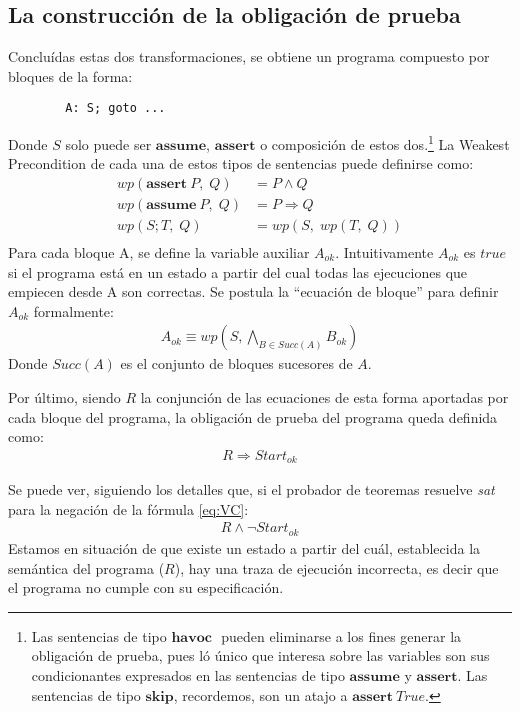 \documentclass[12pt, a4paper, openany, fleqn]{book}
\begin{document}
    \subsection*{La construcción de la obligación de prueba}
    Concluídas estas dos transformaciones, se obtiene un programa compuesto por bloques de la forma:
    \begin{verbatim}
        A: S; goto ...
    \end{verbatim} 
    Donde $S$ solo puede ser $\textbf{assume}$, $\textbf{assert}$ o composición de estos dos.\footnote{Las sentencias de tipo $\textbf{havoc }$ pueden eliminarse a los fines generar la obligación de prueba, pues ló único que interesa sobre las variables son sus condicionantes expresados en las sentencias de tipo $\textbf{assume}$ y $\textbf{assert}$. Las sentencias de tipo $\textbf{skip}$, recordemos, son un atajo a $\textbf{assert}\ True$.}
    La Weakest Precondition de cada una de estos tipos de sentencias puede definirse como:
    \begin{align*}
        wp(\textbf{assert}\ P,\;Q)   &= P \land Q \\
        wp(\textbf{assume}\  P,\; Q) &= P \Rightarrow Q \\
        wp(S;T,\;Q)                  &= wp(S,\;wp(T,\;Q)) \\
    \end{align*}
    Para cada bloque A, se define la variable auxiliar $A_{ok}$. Intuitivamente $A_{ok}$ es $true$ si el programa está en un estado a partir del cual todas las ejecuciones que empiecen desde A son correctas. Se postula la ``ecuación de bloque'' para definir $A_{ok}$ formalmente:
    \begin{align*}
        A_{ok} \equiv wp(S, \bigwedge_{B \in Succ(A)} B_{ok})
    \end{align*}
    Donde $Succ(A)$ es el conjunto de bloques sucesores de $A$.

    Por último, siendo $R$ la conjunción de las ecuaciones de esta forma aportadas por cada bloque del programa, la obligación de prueba del programa queda definida como:
    \begin{align}
        R \Rightarrow Start_{ok} \label{eq:VC}
    \end{align}

    Se puede ver, siguiendo los detalles que, si el probador de teoremas resuelve \textit{sat} para la negación de la fórmula \ref{eq:VC}:
    \begin{align*}
        R \land \lnot Start_{ok}
    \end{align*}
    Estamos en situación de que existe un estado a partir del cuál, establecida la semántica del programa ($R$), hay una traza de ejecución incorrecta, es decir que el programa no cumple con su especificación.
\end{document}
